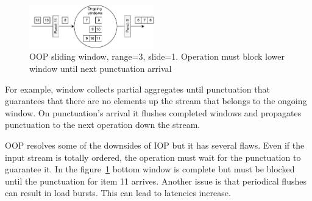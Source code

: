 \begin{figure}[htbp]
  \centering
  \includegraphics[width=0.48\textwidth]{pics/oop}
  \caption{OOP sliding window, range=3, slide=1. Operation must block lower window until next punctuation arrival }
  \label {oop}
\end{figure}

For example, window collects partial aggregates until punctuation that guarantees that there are no elements up the stream that belongs to the ongoing window. On punctuation's arrival it flushes completed windows and propagates punctuation to the next operation down the stream.

OOP resolves some of the downsides of IOP but it has several flaws. Even if the input stream is totally ordered, the operation must wait for the punctuation to guarantee it. In the figure~\ref{oop} bottom window is complete but must be blocked until the punctuation for item 11 arrives. Another issue is that periodical flushes can result in load bursts. This can lead to latencies increase. 
